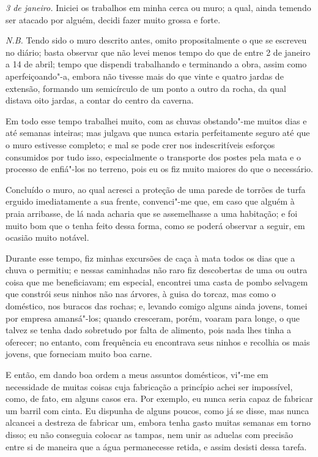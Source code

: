 \emph{3 de janeiro.} Iniciei os trabalhos em minha cerca ou muro; a
qual, ainda temendo ser atacado por alguém, decidi fazer muito grossa e
forte.

\emph{N.B.} Tendo sido o muro descrito antes, omito propositalmente o
que se escreveu no diário; basta observar que não levei menos tempo do
que de entre 2 de janeiro a 14 de abril; tempo que dispendi trabalhando
e terminando a obra, assim como aperfeiçoando"-a, embora não tivesse mais
do que vinte e quatro jardas de extensão, formando um semicírculo de um
ponto a outro da rocha, da qual distava oito jardas, a contar do centro
da caverna.

Em todo esse tempo trabalhei muito, com as chuvas obstando"-me muitos
dias e até semanas inteiras; mas julgava que nunca estaria perfeitamente
seguro até que o muro estivesse completo; e mal se pode crer nos
indescritíveis esforços consumidos por tudo isso, especialmente o
transporte dos postes pela mata e o processo de enfiá"-los no terreno,
pois eu os fiz muito maiores do que o necessário.

Concluído o muro, ao qual acresci a proteção de uma parede de torrões de
turfa erguido imediatamente a sua frente, convenci"-me que, em caso que
alguém à praia arribasse, de lá nada acharia que se assemelhasse a uma
habitação; e foi muito bom que o tenha feito dessa forma, como se poderá
observar a seguir, em ocasião muito notável.

Durante esse tempo, fiz minhas excursões de caça à mata todos os dias
que a chuva o permitiu; e nessas caminhadas não raro fiz descobertas de
uma ou outra coisa que me beneficiavam; em especial, encontrei uma casta
de pombo selvagem que constrói seus ninhos não nas árvores, à guisa do
torcaz, mas como o doméstico, nos buracos das rochas; e, levando comigo
alguns ainda jovens, tomei por empresa amansá"-los; quando cresceram,
porém, voaram para longe, o que talvez se tenha dado sobretudo por falta
de alimento, pois nada lhes tinha a oferecer; no entanto, com frequência
eu encontrava seus ninhos e recolhia os mais jovens, que forneciam muito
boa carne.

E então, em dando boa ordem a meus assuntos domésticos, vi"-me em
necessidade de muitas coisas cuja fabricação a princípio achei ser
impossível, como, de fato, em alguns casos era. Por exemplo, eu nunca
seria capaz de fabricar um barril com cinta. Eu dispunha de alguns
poucos, como já se disse, mas nunca alcancei a destreza de fabricar um,
embora tenha gasto muitas semanas em torno disso; eu não conseguia
colocar as tampas, nem unir as aduelas com precisão entre si de maneira
que a água permanecesse retida, e assim desisti dessa tarefa.

